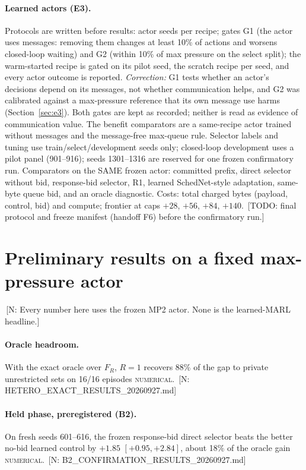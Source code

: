 \documentclass[11pt]{article}
\theoremstyle{definition}
\newcommand{\NUM}{\textsc{numerical}}
\newif\ifshownotes\shownotestrue
\newcommand{\NOTE}[1]{\ifshownotes{\color{notecol}\,\textsf{\footnotesize[N: #1]}}\fi}
\newcommand{\TODO}[1]{\ifshownotes{\color{todocol}\,\textsf{\footnotesize[TODO: #1]}}\fi}
\begin{document}
\paragraph{Learned actors (E3).} Protocols are written before results: actor seeds per recipe; gates G1
(the actor uses messages: removing them changes at least 10\% of actions and worsens closed-loop
waiting) and G2 (within 10\% of max pressure on the select split); the warm-started recipe is gated
on its pilot seed, the scratch recipe per seed, and every actor outcome is reported. \emph{Correction:} G1
tests whether an actor's decisions depend on its messages, not whether communication helps, and G2 was
calibrated against a max-pressure reference that its own message use harms (Section~\ref{sec:e3}). Both gates
are kept as recorded; neither is read as evidence of communication value. The benefit comparators are a
same-recipe actor trained without messages and the message-free max-queue rule. Selector labels
and tuning use train/select/development seeds only; closed-loop development uses a pilot panel
(901--916); seeds 1301--1316 are reserved for one frozen confirmatory run. Comparators on the SAME
frozen actor: committed prefix, direct selector without bid, response-bid selector, R1, learned
SchedNet-style adaptation, same-byte queue bid, and an oracle diagnostic. Costs: total charged bytes
(payload, control, bid) and compute; frontier at caps $+28$, $+56$, $+84$, $+140$.
\TODO{final protocol and freeze manifest (handoff F6) before the confirmatory run.}

\section{Preliminary results on a fixed max-pressure actor}\label{sec:prelim}
\NOTE{Every number here uses the frozen MP2 actor. None is the learned-MARL headline.}

\paragraph{Oracle headroom.} With the exact oracle over $F_R$, $R=1$ recovers 88\% of the gap to
private unrestricted sets on 16/16 episodes \NUM.
\NOTE{HETERO\_EXACT\_RESULTS\_20260927.md}

\paragraph{Held phase, preregistered (B2).} On fresh seeds 601--616, the frozen response-bid
direct selector beats the better no-bid learned control by $+1.85$ $[+0.95,+2.84]$, about 18\% of
the oracle gain \NUM. \NOTE{B2\_CONFIRMATION\_RESULTS\_20260927.md}
\end{document}
